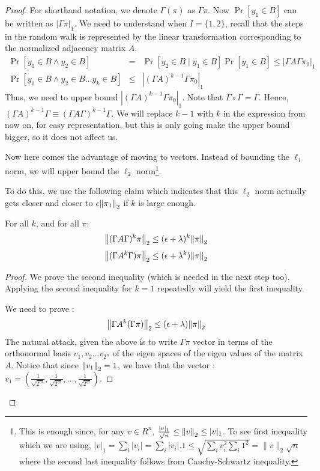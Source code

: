 \begin{proof}
For shorthand notation, we denote $\Gamma(\pi)$ as $\Gamma \pi$. Now $\Pr[y_1 \in B]$ can be written as $|\Gamma \pi|_1$. We need to understand when $I = \{1,2\}$, recall that the steps in the random walk is represented by the linear transformation corresponding to the normalized adjacency matrix $A$.
\begin{eqnarray*}
\Pr[y_1 \in B \land y_2 \in B] & = & \Pr[y_2 \in B \mid y_1 \in B] \Pr[y_1 \in B] \le |\Gamma A \Gamma \pi_0|_1 \\
\Pr[y_1 \in B \land y_2 \in B \ldots y_k \in B] & \le & |(\Gamma A)^{k-1} \Gamma \pi_0|_1
\end{eqnarray*}
Thus, we need to upper bound $|(\Gamma A)^{k-1} \Gamma \pi_0|_1$. Note that $\Gamma \circ \Gamma = \Gamma$. Hence, $(\Gamma A)^{k-1} \Gamma \equiv (\Gamma A \Gamma)^{k-1} \Gamma$. We will replace $k-1$ with $k$ in the expression from now on, for easy representation, but this is only going make the upper bound bigger, so it does not affect us.

Now here comes the advantage of moving to vectors. Instead of bounding the $\ell_1$ norm, we will upper bound the $\ell_2$ norm\footnote{This is enough since, for any $v \in R^n$, $\frac{|v|_1}{\sqrt{n}} \le {\left\lVert v\right\rVert}_2 \le |v|_1$. To see first inequality which we are using, $|v|_1 = \sum_i |v_i| = \sum_i |v_i|.1 \le \sqrt{\sum_i v_i^2 \sum_i 1^2} = \|v\|_2 \sqrt{n} $ where the second last inequality follows from Cauchy-Schwartz inequality.}.

To do this, we use the following claim which indicates that this $\ell_2$ norm actually gets closer and closer to $\epsilon{\left\lVert\pi_1\right\rVert}_2$ if $k$ is large enough.
\begin{claim}
\label{claim:pigamma}
For all $k$, and for all $\pi$:
$${\left\lVert(\Gamma A \Gamma)^k \pi\right\rVert}_2 \le (\epsilon+\lambda)^k {\left\lVert\pi\right\rVert}_2$$
$${\left\lVert(\Gamma A^k \Gamma) \pi\right\rVert}_2 \le (\epsilon+\lambda^k) {\left\lVert\pi\right\rVert}_2$$
\end{claim}
\begin{proof}
We prove the second inequality (which is needed in the next step too). Applying the second inequality for $k=1$ repeatedly will yield the first inequality. 

We need to prove : 
\[ {\left\lVert\Gamma A^k (\Gamma \pi)\right\rVert}_2 \le (\epsilon+\lambda) {\left\lVert\pi\right\rVert}_2 \]
The natural attack, given the above is to write $\Gamma \pi$ vector in terms of the orthonormal basis $v_1, v_2 \ldots v_{2^n}$ of the eigen spaces of the eigen values of the matrix $A$. Notice that since ${\left\lVert v_1\right\rVert}_2 = 1$, we have that the vector : 
$v_1 = \left(\frac{1}{\sqrt{2^m}},\frac{1}{\sqrt{2^m}}, \ldots,\frac{1}{\sqrt{2^m}} \right)$.


\end{proof}
\end{proof}
